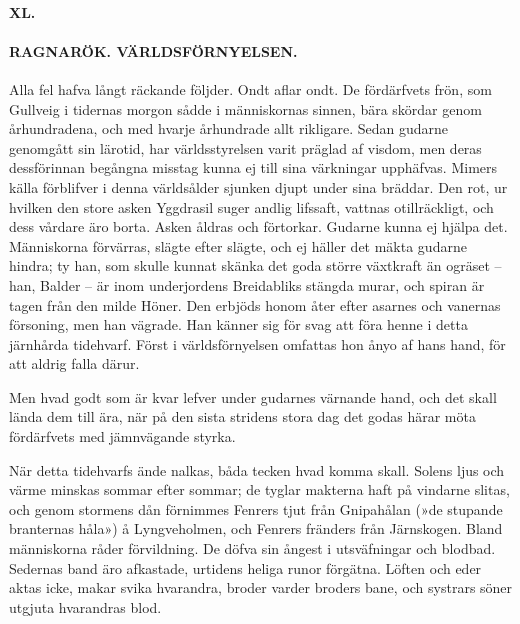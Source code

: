 \protect\hypertarget{lb1625905.xhtmlux5cux23start191}{}{}\protect\hypertarget{lb1625905.xhtmlux5cux23start191-a}{}{}\protect\hypertarget{lb1625905.xhtmlux5cux23start191-b}{}{}\protect\hypertarget{lb1625905.xhtmlux5cux23start191-c}{}{}\protect\hypertarget{lb1625905.xhtmlux5cux23start191-d}{}{}

\paragraph{XL.}

\paragraph{RAGNARÖK. VÄRLDSFÖRNYELSEN.}

Alla fel hafva långt räckande följder. Ondt aflar ondt. De fördärfvets
frön, som Gullveig i tidernas morgon sådde i människornas sinnen, bära
skördar genom århundradena, och med hvarje århundrade allt rikligare.
Sedan gudarne genomgått sin lärotid, har världsstyrelsen varit präglad
af visdom, men deras dessförinnan begångna misstag kunna ej till sina
värkningar upphäfvas. Mimers källa förblifver i denna världsålder
sjunken djupt under sina bräddar. Den rot, ur hvilken den store asken
Yggdrasil suger andlig lifssaft, vattnas otillräckligt, och dess vårdare
äro borta. Asken åldras och förtorkar. Gudarne kunna ej hjälpa det.
Människorna förvärras, slägte efter slägte, och ej häller det mäkta
gudarne hindra; ty han, som skulle kunnat skänka det goda större
växtkraft än ogräset -- han, Balder -- är inom underjordens Breidabliks
stängda murar, och spiran är tagen från den milde Höner. Den erbjöds
honom åter efter asarnes och vanernas försoning, men han vägrade. Han
känner sig för svag att föra henne i detta järnhårda tidehvarf. Först i
världsförnyelsen omfattas hon ånyo af hans hand, för att aldrig falla
därur.

Men hvad godt som är kvar lefver under gudarnes värnande hand, och det
skall lända dem till ära, när på den sista stridens stora dag det godas
härar möta fördärfvets med jämnvägande styrka.

När detta tidehvarfs ände nalkas, båda tecken hvad komma skall. Solens
ljus och värme minskas sommar efter sommar; de tyglar makterna haft på
vindarne slitas, och genom stormens dån förnimmes Fenrers tjut från
Gnipahålan (»de stupande branternas håla») å Lyngveholmen, och Fenrers
fränders från Järnskogen. Bland människorna råder förvildning. De döfva
sin ångest i utsväfningar och blodbad. Sedernas band äro afkastade,
urtidens heliga runor förgätna. Löften
\protect\hypertarget{lb1625905.xhtmlux5cux23start192}{}{}\protect\hypertarget{lb1625905.xhtmlux5cux23start192-a}{}{}\protect\hypertarget{lb1625905.xhtmlux5cux23start192-b}{}{}\protect\hypertarget{lb1625905.xhtmlux5cux23start192-c}{}{}\protect\hypertarget{lb1625905.xhtmlux5cux23start192-d}{}{}
och eder aktas icke, makar svika hvarandra, broder varder broders bane,
och systrars söner utgjuta hvarandras blod.


